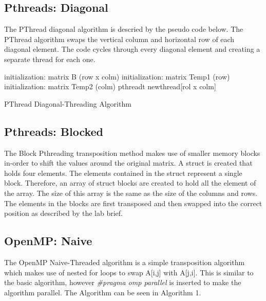 \documentclass[twocolumn, 11pt]{IEEEtran}
\begin{document}
\subsection{Pthreads: Diagonal}

The PThread diagonal algorithm is descried by the pseudo code below. The PThread algorithm swaps the vertical column and horizontal row of each diagonal element. The code cycles through every diagonal element and creating a separate thread for each one.

\begin{algorithm}
\SetAlgoLined
     initialization: matrix B (row x colm)\;
     initialization: matrix Temp1 (row)\;
     initialization: matrix Temp2 (colm)\;
     pthreadt newthread[rol x colm]\;
     \caption{ PThread Diagonal-Threading Algorithm}
\end{algorithm}





\subsection{Pthreads: Blocked}

The Block Pthreading transposition method makes use of smaller memory blocks in-order to shift the values around the original matrix. A struct is created that holds four elements. The elements contained in the struct represent a single block. Therefore, an array of struct blocks are created to hold all the element of the array. The size of this array is the same as the size of the columns and rows. The elements in the blocks are first transposed and then swapped into the correct position as described by the lab brief. 



\subsection{OpenMP: Naive}

The OpenMP Naive-Threaded algorithm is a simple transposition algorithm which makes use of nested for loops to swap A[i,j] with A[j,i]. This is similar to the basic algorithm, however \textit{\#pragma omp parallel} is inserted to make the algorithm parallel. The Algorithm can be seen in Algorithm 1.
\end{document}
